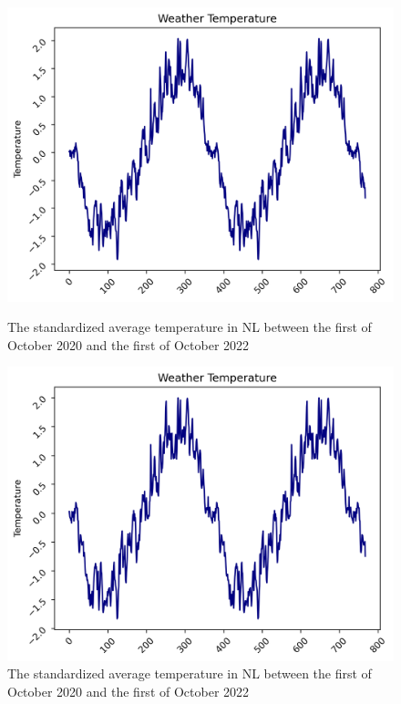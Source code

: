 \begin{figure}
\begin{minipage}{.5\textwidth}
  \centering
  \includegraphics[width=\linewidth]{pics/temperature_total_NL.png}
  \caption{The standardized average temperature in NL between the first of October 2020 and the first of October 2022}
  \label{fig:temperature NL}
\end{minipage}
\begin{minipage}{.5\textwidth}
  \centering
  \includegraphics[width=\linewidth]{pics/temperature_total_DE.png}
  \caption{The standardized average temperature in NL between the first of October 2020 and the first of October 2022}
  \label{fig:temperature DE}
\end{minipage}
\end{figure}

